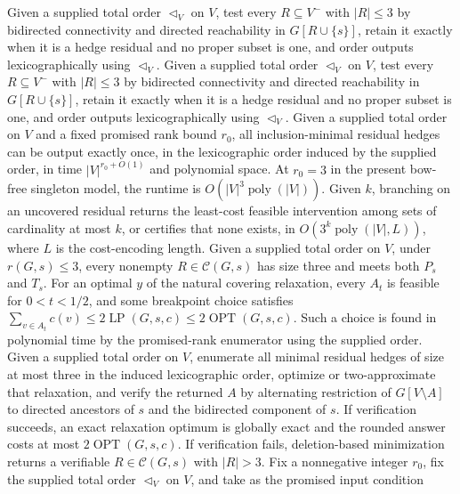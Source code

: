 Given a supplied total order \(\triangleleft_V\) on \(V\), test every \(R\subseteq V^{-}\) with \(|R|\leq3\) by bidirected connectivity and directed reachability in \(G[R\cup\{s\}]\), retain it exactly when it is a hedge residual and no proper subset is one, and order outputs lexicographically using \(\triangleleft_V\).
Given a supplied total order \(\triangleleft_V\) on \(V\), test every \(R\subseteq V^{-}\) with \(|R|\leq3\) by bidirected connectivity and directed reachability in \(G[R\cup\{s\}]\), retain it exactly when it is a hedge residual and no proper subset is one, and order outputs lexicographically using \(\triangleleft_V\).
Given a supplied total order on \(V\) and a fixed promised rank bound \(r_0\), all inclusion-minimal residual hedges can be output exactly once, in the lexicographic order induced by the supplied order, in time \(|V|^{r_0+O(1)}\) and polynomial space. At \(r_0=3\) in the present bow-free singleton model, the runtime is \(O(|V|^3\operatorname{poly}(|V|))\). Given \(k\), branching on an uncovered residual returns the least-cost feasible intervention among sets of cardinality at most \(k\), or certifies that none exists, in \(O(3^k\operatorname{poly}(|V|,L))\), where \(L\) is the cost-encoding length.
Given a supplied total order on \(V\), under \(r(G,s)\leq3\), every nonempty \(R\in\mathcal C(G,s)\) has size three and meets both \(P_s\) and \(T_s\). For an optimal \(y\) of the natural covering relaxation, every \(A_t\) is feasible for \(0<t<1/2\), and some breakpoint choice satisfies \(\sum_{v\in A_t}c(v)\leq2\operatorname{LP}(G,s,c)\leq2\operatorname{OPT}(G,s,c)\). Such a choice is found in polynomial time by the promised-rank enumerator using the supplied order.
Given a supplied total order on \(V\), enumerate all minimal residual hedges of size at most three in the induced lexicographic order, optimize or two-approximate that relaxation, and verify the returned \(A\) by alternating restriction of \(G[V\setminus A]\) to directed ancestors of \(s\) and the bidirected component of \(s\). If verification succeeds, an exact relaxation optimum is globally exact and the rounded answer costs at most \(2\operatorname{OPT}(G,s,c)\). If verification fails, deletion-based minimization returns a verifiable \(R\in\mathcal C(G,s)\) with \(|R|>3\).
Fix a nonnegative integer \(r_0\), fix the supplied total order \(\triangleleft_V\) on \(V\), and take as the promised input condition
